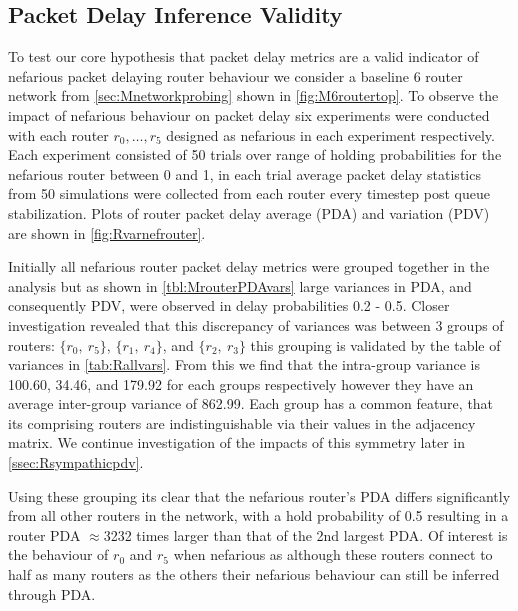 \subsection{Packet Delay Inference Validity}
To test our core hypothesis that packet delay metrics are a valid indicator of nefarious packet delaying router behaviour we consider a baseline 6 router network from \cref{sec:Mnetworkprobing} shown in \cref{fig:M6routertop}. To observe the impact of nefarious behaviour on packet delay six experiments were conducted with each router $r_0,\dots, r_5$ designed as nefarious in each experiment respectively. Each experiment consisted of 50 trials over range of holding probabilities for the nefarious router between 0 and 1, in each trial average packet delay statistics from 50 simulations were collected from each router every timestep post queue stabilization. Plots of router packet delay average (PDA) and variation (PDV) are shown in \cref{fig:Rvarnefrouter}.\par
Initially all nefarious router packet delay metrics were grouped together in the analysis but as shown in \cref{tbl:MrouterPDAvars} large variances in PDA, and consequently PDV, were observed in delay probabilities 0.2 - 0.5. Closer investigation revealed that this discrepancy of variances was between 3 groups of routers: $\{r_0,\ r_5\}$, $\{r_1,\ r_4\}$, and $\{r_2,\ r_3\}$ this grouping is validated by the table of variances in \cref{tab:Rallvars}. From this we find that the intra-group variance is 100.60, 34.46, and 179.92 for each groups respectively however they have an average inter-group variance of 862.99. Each group has a common feature, that its comprising routers are indistinguishable via their values in the adjacency matrix. We continue investigation of the impacts of this symmetry later in \cref{ssec:Rsympathicpdv}.\par
Using these grouping its clear that the nefarious router's PDA differs significantly from all other routers in the network, with a hold probability of 0.5 resulting in a router PDA $\approx$3232 times larger than that of the 2nd largest PDA. Of interest is the behaviour of $r_0$ and $r_5$ when nefarious as although these routers connect to half as many routers as the others their nefarious behaviour can still be inferred through PDA.\par

